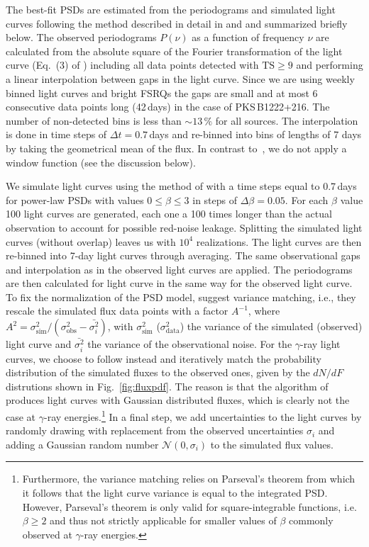 \documentclass[twocolumn,linenumbers]{aastex62}
\newcommand{\gray}{$\gamma$-ray\xspace}
\begin{document}
The best-fit PSDs are estimated from the periodograms and simulated light curves following the method described in detail in \citet{2014MNRAS.445..437M} and \citet{2013MNRAS.433..907E} and summarized briefly below.
The observed periodograms $P(\nu)$ as a function of frequency $\nu$ are calculated from the absolute square of the Fourier transformation of the light curve (Eq.~(3) of \citealt{2014MNRAS.445..437M}) including all 
data points detected with $\mathrm{TS} \geqslant 9$ and performing a linear interpolation between gaps in the light curve. Since we are using weekly binned light curves and bright FSRQs the gaps are small and at most 6 consecutive data points long (42\,days) in the case of PKS\,B1222+216. The number of non-detected bins is less than $\sim13\,\%$ for all sources.
The interpolation is done in time steps of $\Delta t=0.7\,$days and 
 re-binned into bins of lengths of 7 days by taking the geometrical mean of the flux.
In contrast to~\citet{2014MNRAS.445..437M}, we do not apply a window function (see the discussion below). 

We simulate light curves using the method of \citet{1995A&A...300..707T} with a time steps equal to 0.7\,days for power-law PSDs with values $0 \leqslant \beta \leqslant 3$ in steps of $\Delta\beta = 0.05$. For each $\beta$ value 100 light curves are generated, each one a 100 times longer than the actual observation to account for possible red-noise leakage. Splitting the simulated light curves (without overlap) leaves us with $10^4$ realizations. 
The light curves are then re-binned into 7-day light curves through averaging. The same observational gaps and interpolation as in the observed light curves are applied. 
The periodograms are then calculated for light curve in the same way for the observed light curve.
To fix the normalization of the PSD model, \citet{2014MNRAS.445..437M} suggest variance matching, i.e., they rescale the simulated flux data points with a factor $A^{-1}$, where $A^2 = \sigma_\mathrm{sim}^2 / (\sigma_\mathrm{obs}^2 - \bar{\sigma_i^2})$, with $\sigma_\mathrm{sim}^2$ ($\sigma_\mathrm{data}^2$) the variance of the simulated (observed) light curve and $\bar{\sigma_i^2}$ the variance of the observational noise.
For the \gray light curves, we choose to follow \citet{2013MNRAS.433..907E} instead and iteratively match the probability distribution of the simulated fluxes to the observed ones, given by the $dN/dF$ distrutions shown in Fig.~\ref{fig:fluxpdf}. 
The reason is that the algorithm of \citet{1995A&A...300..707T} produces light curves with Gaussian distributed fluxes, which is clearly not the case at \gray energies.\footnote{Furthermore, the variance matching relies on Parseval's theorem from which it follows that the light curve variance is equal to the integrated PSD. However, Parseval's theorem is only valid for square-integrable functions, i.e. $\beta \geqslant 2$ and thus not strictly applicable for smaller values of $\beta$ commonly observed at \gray energies.}
In a final step, we add uncertainties to the light curves by randomly drawing with replacement from the observed uncertainties $\sigma_i$ and adding a Gaussian random number $\mathcal{N}(0,\sigma_i)$ to the simulated flux values.
\end{document}
